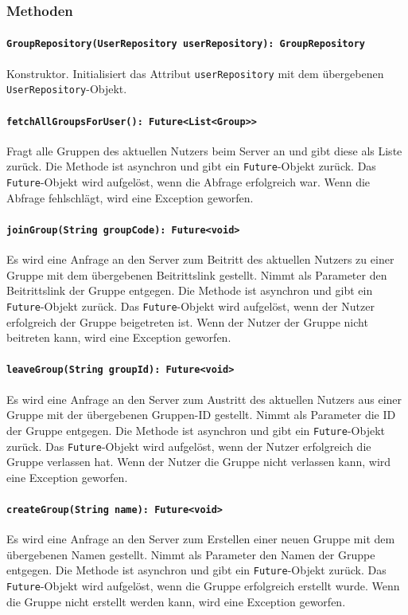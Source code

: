 \documentclass{entwurfsheft}
\begin{document}
\begin{sloppypar}
\subsubsection*{Methoden}
\paragraph{\texttt{GroupRepository(UserRepository userRepository): GroupRepository}}
Konstruktor. Initialisiert das Attribut \texttt{userRepository} mit dem übergebenen \texttt{UserRepository}-Objekt.
\paragraph{\texttt{fetchAllGroupsForUser(): Future<List<Group>>}}
Fragt alle Gruppen des aktuellen Nutzers beim Server an und gibt diese als Liste zurück. Die Methode ist asynchron und gibt ein \texttt{Future}-Objekt zurück. Das \texttt{Future}-Objekt wird aufgelöst, wenn die Abfrage erfolgreich war. Wenn die Abfrage fehlschlägt, wird eine Exception geworfen.
\paragraph{\texttt{joinGroup(String groupCode): Future<void>}}
Es wird eine Anfrage an den Server zum Beitritt des aktuellen Nutzers zu einer Gruppe mit dem übergebenen Beitrittslink gestellt. Nimmt als Parameter den Beitrittslink der Gruppe entgegen. Die Methode ist asynchron und gibt ein \texttt{Future}-Objekt zurück. Das \texttt{Future}-Objekt wird aufgelöst, wenn der Nutzer erfolgreich der Gruppe beigetreten ist. Wenn der Nutzer der Gruppe nicht beitreten kann, wird eine Exception geworfen.
\paragraph{\texttt{leaveGroup(String groupId): Future<void>}}
Es wird eine Anfrage an den Server zum Austritt des aktuellen Nutzers aus einer Gruppe mit der übergebenen Gruppen-ID gestellt. Nimmt als Parameter die ID der Gruppe entgegen. Die Methode ist asynchron und gibt ein \texttt{Future}-Objekt zurück. Das \texttt{Future}-Objekt wird aufgelöst, wenn der Nutzer erfolgreich die Gruppe verlassen hat. Wenn der Nutzer die Gruppe nicht verlassen kann, wird eine Exception geworfen.
\paragraph{\texttt{createGroup(String name): Future<void>}}
Es wird eine Anfrage an den Server zum Erstellen einer neuen Gruppe mit dem übergebenen Namen gestellt. Nimmt als Parameter den Namen der Gruppe entgegen. Die Methode ist asynchron und gibt ein \texttt{Future}-Objekt zurück. Das \texttt{Future}-Objekt wird aufgelöst, wenn die Gruppe erfolgreich erstellt wurde. Wenn die Gruppe nicht erstellt werden kann, wird eine Exception geworfen.

\end{sloppypar}
\end{document}
